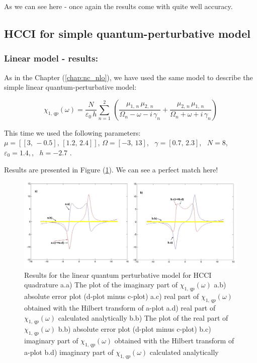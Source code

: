 \documentclass[12pt,twoside,a4paper]{article}
\numberwithin{equation}{subsection}
\numberwithin{figure}{subsection}
\begin{document}
As we can see here - once again the results come with quite well accuracy.

\subsection{HCCI for simple quantum-perturbative model} \label{chap:hcc_quantum}
 
\subsubsection*{Linear model - results:}

As in the Chapter (\ref{chap:nc_nlo}), we have used the same model to describe the simple linear quantum-perturbative model: 

\begin{equation} \label{eq:hcc_qp}
  {\chi_{1, \,qp}}(\omega ) = \frac {N}{\varepsilon_0\,h} \sum_{n=1}^{2}\,(\frac {{\mu_{1, \,n}}\,{ \mu_{2, \,n}}}{{\Omega_{n}}
  - \omega  - i\,{\gamma_{n}}} + \frac {{\mu_{2, \,n}}\,{\mu_{1, \,n}}}{{\Omega_{n}} + \omega + i\,{\gamma_{n}}})
\end{equation}

This time we used the following parameters: \\
$\mu = [[3, \, - 0.5], \,[1.2, \,2.4]]$, 
$\Omega = [ - 3, \,13]$, \, 
$\gamma = [0.7, \,2.3]$, \,
$N = 8$, \,
$\varepsilon_{0} = 1.4,$, \, 
$h = - 2.7$ .

Results are presented in Figure (\ref{fig:hcc_qp1}). We can see a perfect match here!

\begin{figure}
  \includegraphics[width=150mm]{img/hcc_qp1.png}
  \caption{Results for the linear quantum perturbative model for HCCI quadrature
    a.a) The plot of the imaginary part of ${\chi_{1, \, qp}}(\omega )$
    a.b) absolute error plot (d-plot minus c-plot) 
    a.c) real part of ${\chi_{1, \, qp}}(\omega )$ obtained with the Hilbert transform of a-plot 
    a.d) real part of ${\chi_{1, \, qp}}(\omega )$ calculated analytically 
    b.b) The plot of the real part of ${\chi_{1, \, qp}}(\omega )$ 
    b.b) absolute error plot (d-plot minus c-plot) 
    b.c) imaginary part of ${\chi_{1, \, qp}}(\omega )$ obtained with the Hilbert transform of a-plot 
    b.d) imaginary part of ${\chi_{1, \, qp}}(\omega )$ calculated analytically  
    \label{fig:hcc_qp1}
  }
\end{figure}
\end{document}
